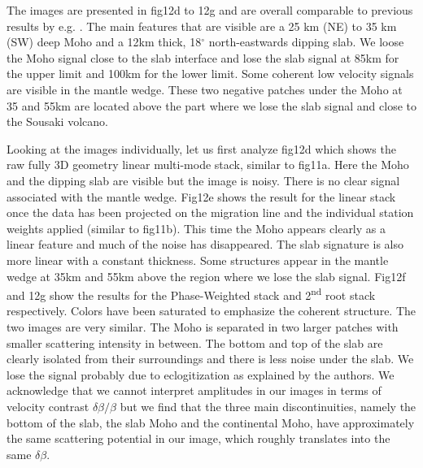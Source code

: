 \documentclass[10pt,a4paper]{article}
\numberwithin{equation}{section}
\begin{document}
The images are presented in fig12d to 12g and are overall comparable to previous results by e.g. \cite{pear_jgr_12}.
The main features that are visible are a 25 km (NE) to 35 km (SW) deep Moho and a 12km thick, 18$^{\circ}$ north-eastwards dipping slab.
We loose the Moho signal close to the slab interface and lose the slab signal at 85km for the upper limit and 100km for the lower limit.
Some coherent low velocity signals are visible in the mantle wedge.
These two negative patches under the Moho at 35 and 55km are located above the part where we lose the slab signal and close to the Sousaki volcano.

Looking at the images individually, let us first analyze fig12d which shows the raw fully 3D geometry linear multi-mode stack, similar to fig11a.
Here the Moho and the dipping slab are visible but the image is noisy.
There is no clear signal associated with the mantle wedge.
Fig12e shows the result for the linear stack once the data has been projected on the migration line and the individual station weights applied (similar to fig11b).
This time the Moho appears clearly as a linear feature and much of the noise has disappeared.
The slab signature is also more linear with a constant thickness.
Some structures appear in the mantle wedge at 35km and 55km above the region where we lose the slab signal.
Fig12f and 12g show the results for the Phase-Weighted stack and 2\textsuperscript{nd} root stack respectively.
Colors have been saturated to emphasize the coherent structure.
The two images are very similar.
The Moho is separated in two larger patches with smaller scattering intensity in between.
The bottom and top of the slab are clearly isolated from their surroundings and there is less noise under the slab.
%
We lose the signal probably due to eclogitization as explained by the authors.
We acknowledge that we cannot interpret amplitudes in our images in terms of velocity contrast $\delta \beta / \beta$ but we find that the three main discontinuities, namely the bottom of the slab, the slab Moho and the continental Moho, have approximately the same scattering potential in our image, which roughly translates into the same $\delta \beta$.
\end{document}
